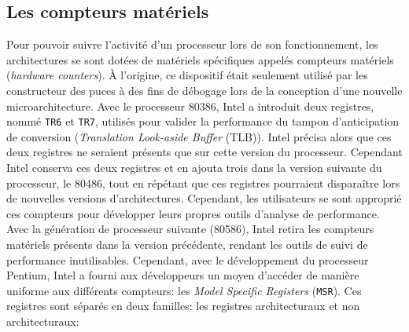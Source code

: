     \subsection{Les compteurs matériels}\label{annexe:hc}
        
        Pour pouvoir suivre l'activité d'un processeur lors de son fonctionnement, les architectures se sont dotées de matériels spécifiques appelés compteurs matériels (\textit{hardware counters}). À l'origine, ce dispositif était seulement utilisé par les constructeur des puces à des fins de débogage lors de la conception d'une nouvelle microarchitecture. Avec le processeur 80386, Intel a introduit deux registres, nommé \verb|TR6| et \verb|TR7|, utilisés pour valider la performance du tampon d'anticipation de conversion (\textit{Translation Look-aside Buffer} (TLB)). Intel précisa alors que ces deux registres ne seraient présents que sur cette version du processeur. Cependant Intel conserva ces deux registres et en ajouta trois dans la version suivante du processeur, le 80486, tout en répétant que ces registres pourraient disparaître lors de nouvelles versions d'architectures. Cependant, les utilisateurs se sont approprié ces compteurs pour développer leurs propres outils d'analyse de performance. Avec la génération de processeur suivante (80586), Intel retira les compteurs matériels présents dans la version précédente, rendant les outils de suivi de performance inutilisables.
        Cependant, avec le développement du processeur Pentium, Intel a fourni aux développeurs un moyen d'accéder de manière uniforme aux différents compteurs: les \textit{Model Specific Registers} (\verb|MSR|). Ces registres sont séparés en deux familles: les registres architecturaux et non architecturaux:
